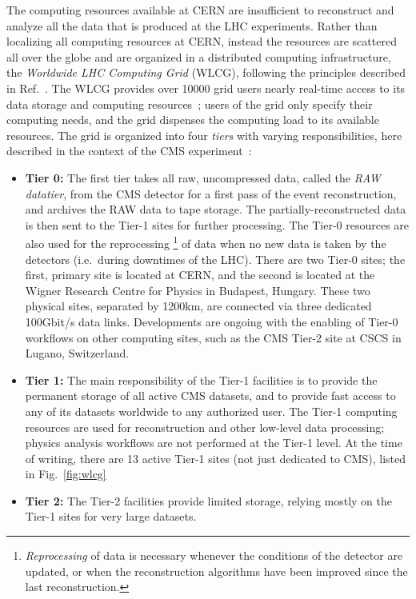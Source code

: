 The computing resources available at CERN are insufficient to reconstruct and analyze all the data that is produced at the LHC experiments.
% 
Rather than localizing all computing resources at CERN, instead the resources are scattered all over the globe and are organized in a distributed computing infrastructure, the \textit{Worldwide LHC Computing Grid} (WLCG), following the principles described in Ref.~\cite{thegrid}.
% 
The WLCG provides over 10000 grid users nearly real-time access to its data storage and computing resources~\cite{wlcgwebsite}; users of the grid only specify their computing needs, and the grid dispenses the computing load to its available resources.
% 
The grid is organized into four \textit{tiers} with varying responsibilities, here described in the context of the CMS experiment~\cite{Bayatyan:838359,CMS:2005aa}:
% 
\begin{itemize}
\item \textbf{Tier 0:} The first tier takes all raw, uncompressed data, called the \emph{RAW datatier}, from the CMS detector for a first pass of the event reconstruction, and archives the RAW data to tape storage.
% 
The partially-reconstructed data is then sent to the Tier-1 sites for further processing.
% 
The Tier-0 resources are also used for the reprocessing%
% 
\footnote{%
\textit{Reprocessing} of data is necessary whenever the conditions of the detector are updated, or when the reconstruction algorithms have been improved since the last reconstruction.
}
% 
of data when no new data is taken by the detectors (i.e.\ during downtimes of the LHC).
% 
There are two Tier-0 sites; the first, primary site is located at CERN, and the second is located at the Wigner Research Centre for Physics in Budapest, Hungary.
% 
These two physical sites, separated by 1200\unit{km}, are connected via three dedicated 100\unit{Gbit/s} data links.
% 
Developments are ongoing with the enabling of Tier-0 workflows on other computing sites, such as the CMS Tier-2 site at CSCS in Lugano, Switzerland.
% 
\item \textbf{Tier 1:} The main responsibility of the Tier-1 facilities is to provide the permanent storage of all active CMS datasets, and to provide fast access to any of its datasets worldwide to any authorized user.
% 
The Tier-1 computing resources are used for reconstruction and other low-level data processing; physics analysis workflows are not performed at the Tier-1 level.
% 
At the time of writing, there are 13 active Tier-1 sites (not just dedicated to CMS), listed in Fig.~\ref{fig:wlcg}
% 
\item \textbf{Tier 2:} The Tier-2 facilities provide limited storage, relying mostly on the Tier-1 sites for very large datasets.

\end{itemize}
